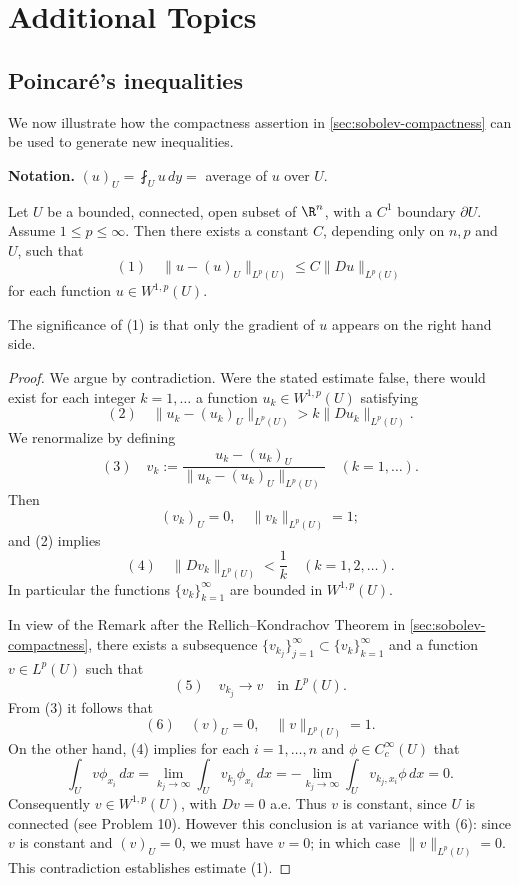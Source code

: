 \section{Additional Topics}
\label{sec:sobolev-additional-topics}

\subsection{Poincaré's inequalities}

We now illustrate how the compactness assertion in \cref{sec:sobolev-compactness} can be used to generate new inequalities.

\textbf{Notation.} $(u)_U = \fint_U u\,dy =$ average of $u$ over $U$.

\begin{theorem}
\label{thm:poincares-inequality-connected}
Let $U$ be a bounded, connected, open subset of $\R^n$, with a $C^1$ boundary $\partial U$. Assume $1 \le p \le \infty$. Then there exists a constant $C$, depending only on $n,p$ and $U$, such that
$$(1) \quad \|u - (u)_U\|_{L^p(U)} \le C\|Du\|_{L^p(U)}$$
for each function $u \in W^{1,p}(U)$.
\end{theorem}

The significance of (1) is that only the gradient of $u$ appears on the right hand side.

\begin{proof}
We argue by contradiction. Were the stated estimate false, there would exist for each integer $k = 1,\ldots$ a function $u_k \in W^{1,p}(U)$ satisfying
$$(2) \quad \|u_k - (u_k)_U\|_{L^p(U)} > k\|Du_k\|_{L^p(U)}.$$
We renormalize by defining
$$(3) \quad v_k := \frac{u_k - (u_k)_U}{\|u_k - (u_k)_U\|_{L^p(U)}} \quad (k = 1,\ldots).$$
Then
$$(v_k)_U = 0, \quad \|v_k\|_{L^p(U)} = 1;$$
and (2) implies
$$(4) \quad \|Dv_k\|_{L^p(U)} < \frac{1}{k} \quad (k = 1,2,\ldots).$$
In particular the functions $\{v_k\}_{k=1}^\infty$ are bounded in $W^{1,p}(U)$.

In view of the Remark after the Rellich--Kondrachov Theorem in \cref{sec:sobolev-compactness}, there exists a subsequence $\{v_{k_j}\}_{j=1}^\infty \subset \{v_k\}_{k=1}^\infty$ and a function $v \in L^p(U)$ such that
$$(5) \quad v_{k_j} \to v \quad \text{in } L^p(U).$$
From (3) it follows that
$$(6) \quad (v)_U = 0, \quad \|v\|_{L^p(U)} = 1.$$
On the other hand, (4) implies for each $i = 1, \ldots, n$ and $\phi \in C_c^\infty(U)$ that
$$\int_U v\phi_{x_i}\, dx = \lim_{k_j \to \infty} \int_U v_{k_j}\phi_{x_i}\, dx = -\lim_{k_j \to \infty} \int_U v_{k_j,x_i}\phi\, dx = 0.$$
Consequently $v \in W^{1,p}(U)$, with $Dv = 0$ a.e. Thus $v$ is constant, since $U$ is connected (see Problem 10). However this conclusion is at variance with (6): since $v$ is constant and $(v)_U = 0$, we must have $v = 0$; in which case $\|v\|_{L^p(U)} = 0$. This contradiction establishes estimate (1).
\end{proof}

